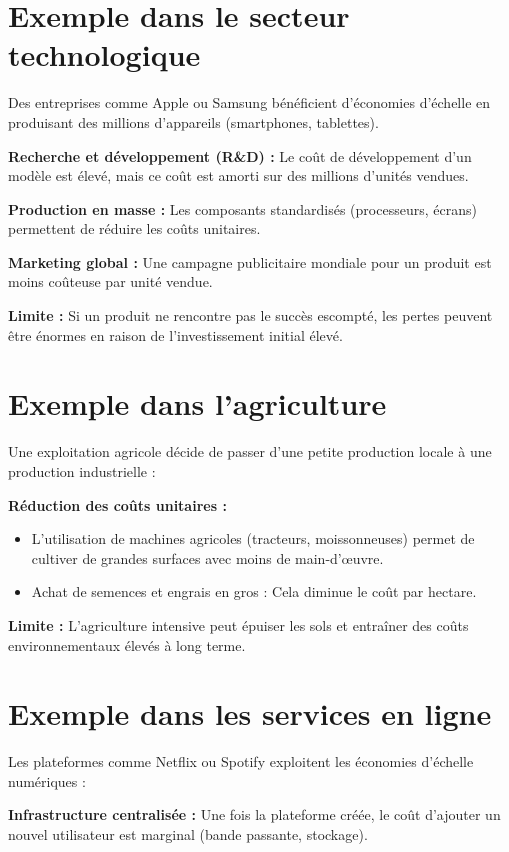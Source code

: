 \section{Exemple dans le secteur technologique}
Des entreprises comme Apple ou Samsung bénéficient d’économies d’échelle en
produisant des millions d’appareils (smartphones, tablettes).

\textbf{Recherche et développement (R\&D) :}
Le coût de développement d’un modèle est élevé, mais ce coût est amorti sur des millions d’unités vendues.

\textbf{Production en masse :}
Les composants standardisés (processeurs, écrans) permettent de réduire les coûts unitaires.

\textbf{Marketing global :}
Une campagne publicitaire mondiale pour un produit est moins coûteuse par unité vendue.

\textbf{Limite :}
Si un produit ne rencontre pas le succès escompté, les pertes peuvent être énormes en raison de l’investissement initial élevé.

\section{Exemple dans l’agriculture}
Une exploitation agricole décide de passer d’une petite production locale à une
production industrielle :

\textbf{Réduction des coûts unitaires :}
\begin{itemize}
  \item L’utilisation de machines agricoles (tracteurs, moissonneuses) permet de
        cultiver de grandes surfaces avec moins de main-d'œuvre.
  \item Achat de semences et engrais en gros : Cela diminue le coût par hectare.
\end{itemize}

\textbf{Limite :}
L’agriculture intensive peut épuiser les sols et entraîner des coûts environnementaux élevés à long terme.

\section{Exemple dans les services en ligne}
Les plateformes comme Netflix ou Spotify exploitent les économies d’échelle
numériques :

\textbf{Infrastructure centralisée :}
Une fois la plateforme créée, le coût d’ajouter un nouvel utilisateur est marginal (bande passante, stockage).

